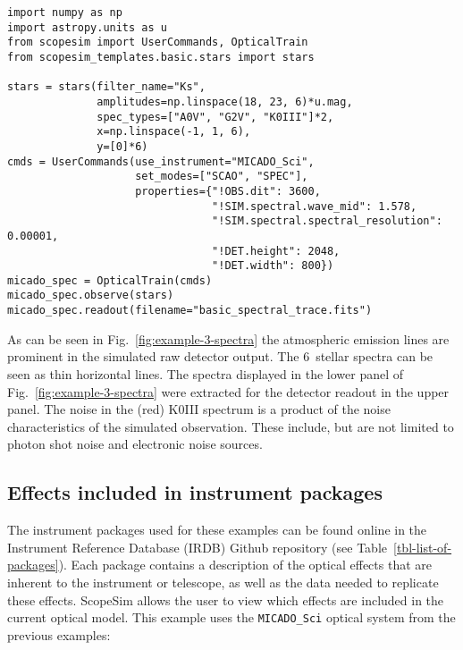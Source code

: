 \begin{lstlisting}[frame=single]
import numpy as np
import astropy.units as u
from scopesim import UserCommands, OpticalTrain
from scopesim_templates.basic.stars import stars

stars = stars(filter_name="Ks",
              amplitudes=np.linspace(18, 23, 6)*u.mag,
              spec_types=["A0V", "G2V", "K0III"]*2,
              x=np.linspace(-1, 1, 6),
              y=[0]*6)
cmds = UserCommands(use_instrument="MICADO_Sci",
                    set_modes=["SCAO", "SPEC"],
                    properties={"!OBS.dit": 3600,
                                "!SIM.spectral.wave_mid": 1.578,
                                "!SIM.spectral.spectral_resolution": 0.00001,
                                "!DET.height": 2048,
                                "!DET.width": 800})
micado_spec = OpticalTrain(cmds)
micado_spec.observe(stars)
micado_spec.readout(filename="basic_spectral_trace.fits")
\end{lstlisting}

As can be seen in Fig.~\ref{fig:example-3-spectra} the atmospheric emission lines are prominent in the simulated raw detector output.
The 6~stellar spectra can be seen as thin horizontal lines.
The spectra displayed in the lower panel of Fig.~\ref{fig:example-3-spectra} were extracted for the detector readout in the upper panel.
The noise in the (red) K0III spectrum is a product of the noise characteristics of the simulated observation.
These include, but are not limited to photon shot noise and electronic noise sources.


\subsection{Effects included in instrument packages}
\label{effects-included-in-instrument-packages}

The instrument packages used for these examples can be found online in the Instrument Reference Database (IRDB) Github repository (see Table~\ref{tbl-list-of-packages}).
Each package contains a description of the optical effects that are inherent to the instrument or telescope, as well as the data needed to replicate these effects.
ScopeSim allows the user to view which effects are included in the current optical model.
This example uses the \lstinline{MICADO_Sci} optical system from the previous examples:

